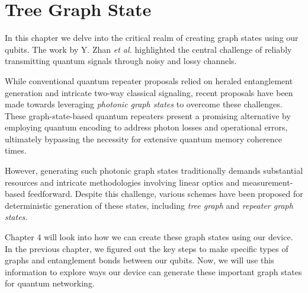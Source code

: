 \chapter{Tree Graph State}
\label{chap:tree_graph_state}

In this chapter we delve into the critical realm of creating graph states using our qubits.
The work by Y. Zhan \emph{et al.} \cite{tree_graph_state} highlighted the central challenge of reliably transmitting quantum signals through noisy and lossy channels.

While conventional quantum repeater proposals relied on heraled entanglement generation and intricate two-way classical signaling, recent proposals have been made towards leveraging \emph{photonic graph states} to overcome these challenges.
These graph-state-based quantum repeaters present a promising alternative by employing quantum encoding to address photon losses and operational errors, ultimately bypassing the necessity for extensive quantum memory coherence times.

However, generating such photonic graph states traditionally demands substantial resources and intricate methodologies involving linear optics and measurement-based feedforward. 
Despite this challenge, various schemes have been proposed for deterministic generation of these states, including \emph{tree graph} and \emph{repeater graph states}.

Chapter 4 will look into how we can create these graph states using our device. 
In the previous chapter, we figured out the key steps to make specific types of graphs and entanglement bonds between our qubits.
Now, we will use this information to explore ways our device can generate these important graph states for quantum networking.


